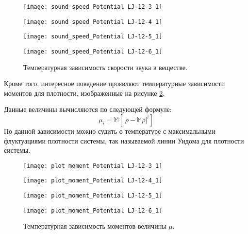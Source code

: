 \begin{figure}[h]
\begin{center}
\begin{minipage}[h]{0.45\linewidth}
\texttt{[image: sound\_speed\_Potential LJ-12-3\_1]}
\end{minipage}
\begin{minipage}[h]{0.45\linewidth}
\texttt{[image: sound\_speed\_Potential LJ-12-4\_1]}
\end{minipage}


\begin{minipage}[h]{0.45\linewidth}
\texttt{[image: sound\_speed\_Potential LJ-12-5\_1]}
\end{minipage}
\begin{minipage}[h]{0.45\linewidth}
\texttt{[image: sound\_speed\_Potential LJ-12-6\_1]}
\end{minipage}
\caption{Температурная зависимость скорости звука в веществе.}
\label{risC}
\end{center}
\end{figure}

Кроме того, интересное поведение проявляют температурные зависимости  моментов для плотности, изображенные на рисунке \ref{risMu}.

Данные величины вычисляются по следующей формуле:
\begin{equation}
\mu_i = \mathbb{M} \left[ |\rho - \mathbb{M} \rho|^i \right]
\end{equation}
По данной зависимости можно судить о температуре с максимальными флуктуациями плотности системы, так называемой линии Уидома для плотности системы.

\begin{figure}[h]
\begin{center}
\begin{minipage}[h]{0.45\linewidth}
\texttt{[image: plot\_moment\_Potential LJ-12-3\_1]}
\end{minipage}
\begin{minipage}[h]{0.45\linewidth}
\texttt{[image: plot\_moment\_Potential LJ-12-4\_1]}
\end{minipage}


\begin{minipage}[h]{0.45\linewidth}
\texttt{[image: plot\_moment\_Potential LJ-12-5\_1]}
\end{minipage}
\begin{minipage}[h]{0.45\linewidth}
\texttt{[image: plot\_moment\_Potential LJ-12-6\_1]}
\end{minipage}
\caption{Температурная зависимость моментов величины $\mu$.}
\label{risMu}
\end{center}
\end{figure}



